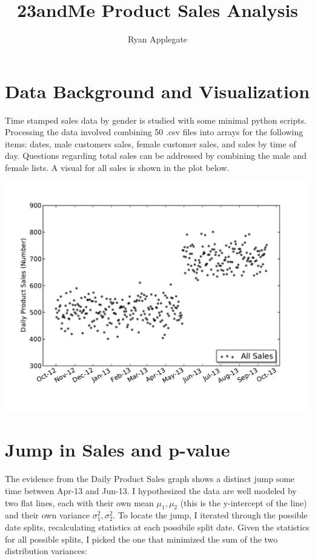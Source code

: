 \documentclass{article}[12pt]
\title{23andMe Product Sales Analysis}
\author{Ryan Applegate}
\begin{document}
\maketitle

\section{Data Background and Visualization}

Time stamped sales data by gender is studied with some minimal python scripts. 
Processing the data involved combining 50 .csv files into arrays for the
 following items: dates, male customers sales, female customer sales, and
sales by time of day. Questions
 regarding total sales can be addressed by combining the
male and female lists. A visual for all sales is shown in the plot below.

\includegraphics[scale=0.7]{../DailySalesNumbersFINAL.pdf}

\section{Jump in Sales and p-value}
The evidence from the Daily Product Sales graph shows a distinct jump some time
between Apr-13 and Jun-13. I hypothesized the data are well modeled by
two flat lines, each with their
own mean $\mu_1,\mu_2$ (this is the y-intercept of the line) and their own variance $\sigma^2_1, \sigma^2_2$. To locate
the jump, I iterated through the possible date splits, recalculating statistics
 at each possibile
split date. Given the statistics for all possible splits, I picked the one that
minimized the sum of the two distribution variances:
\end{document}
